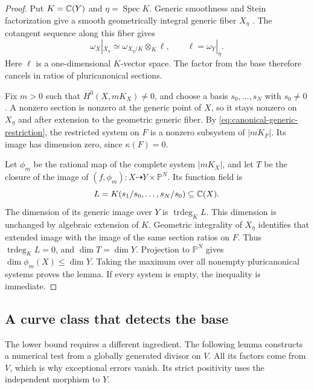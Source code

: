 \begin{proof}
Put $K=\mathbb C(Y)$ and $\eta=\operatorname{Spec}K$. Generic smoothness
and Stein factorization give a smooth geometrically integral generic
fiber $X_\eta$ \cite[III, Sections~10--11]{Hartshorne1977}.
The cotangent sequence along this fiber gives
\begin{equation}\label{eq:canonical-generic-restriction}
 \omega_X|_{X_\eta}
 \simeq\omega_{X_\eta/K}\otimes_K\ell,
 \qquad \ell=\omega_Y|_\eta.
\end{equation}
Here $\ell$ is a one-dimensional $K$-vector space. The factor from
the base therefore cancels in ratios of pluricanonical sections.

Fix $m>0$ such that $H^0(X,mK_X)\ne0$, and choose a basis
$s_0,\ldots,s_N$ with $s_0\ne0$. A nonzero section is nonzero at
the generic point of $X$, so it stays nonzero on $X_\eta$ and after
extension to the geometric generic fiber. By
\eqref{eq:canonical-generic-restriction}, the restricted system on
$F$ is a nonzero subsystem of $|mK_F|$. Its image has dimension zero,
since $\kappa(F)=0$.

Let $\phi_m$ be the rational map of the complete system $|mK_X|$,
and let $T$ be the closure of the image of
$(f,\phi_m)\colon X\dashrightarrow Y\times\mathbb P^N$.
Its function field is
\[
 L=K(s_1/s_0,\ldots,s_N/s_0)\subseteq\mathbb C(X).
\]
The dimension of its generic image over $Y$ is
$\operatorname{trdeg}_K L$. This dimension is unchanged by algebraic
extension of $K$. Geometric integrality of $X_\eta$ identifies that
extended image with the image of the same section ratios on $F$.
Thus $\operatorname{trdeg}_K L=0$, and $\dim T=\dim Y$.
Projection to $\mathbb P^N$ gives $\dim\phi_m(X)\leq\dim Y$.
Taking the maximum over all nonempty pluricanonical systems proves
the lemma. If every system is empty, the inequality is immediate.
\end{proof}

\subsection{A curve class that detects the base}

The lower bound requires a different ingredient. The following lemma
constructs a numerical test from a globally generated divisor on $V$.
All its factors come from $V$, which is why exceptional errors vanish.
Its strict positivity uses the independent morphism to $Y$.

